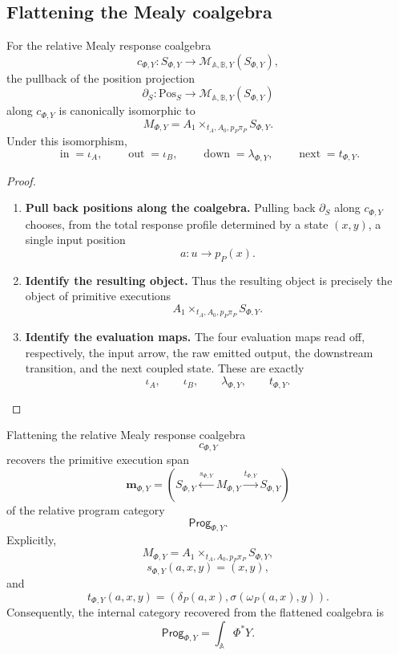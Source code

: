 \subsection{Flattening the Mealy coalgebra}
\label{subsec:poly-relative-flattening-mealy-coalgebra}

\begin{lemma}
\label{lem:poly-relative-mealy-position-pullback}
For the relative Mealy response coalgebra
\[
c_{\Phi,Y}:S_{\Phi,Y}\to
\mathcal M_{\mathbb A,\mathbb B,Y}(S_{\Phi,Y}),
\]
the pullback of the position projection
\[
\partial_S:\mathrm{Pos}_S\to
\mathcal M_{\mathbb A,\mathbb B,Y}(S_{\Phi,Y})
\]
along \(c_{\Phi,Y}\) is canonically isomorphic to
\[
M_{\Phi,Y}
=
A_1\times_{t_A,A_0,p_P\pi_P}S_{\Phi,Y}.
\]
Under this isomorphism,
\[
\operatorname{in}=\iota_A,
\qquad
\operatorname{out}=\iota_B,
\qquad
\operatorname{down}=\lambda_{\Phi,Y},
\qquad
\operatorname{next}=t_{\Phi,Y}.
\]
\end{lemma}

\begin{proof}
\leavevmode
\begin{enumerate}
\item \textbf{Pull back positions along the coalgebra.}
Pulling back \(\partial_S\) along \(c_{\Phi,Y}\) chooses, from the total
response profile determined by a state \((x,y)\), a single input position
\[
a:u\to p_P(x).
\]

\item \textbf{Identify the resulting object.}
Thus the resulting object is precisely the object of primitive executions
\[
A_1\times_{t_A,A_0,p_P\pi_P}S_{\Phi,Y}.
\]

\item \textbf{Identify the evaluation maps.}
The four evaluation maps read off, respectively, the input arrow, the raw
emitted output, the downstream transition, and the next coupled state.  These
are exactly
\[
\iota_A,\qquad
\iota_B,\qquad
\lambda_{\Phi,Y},\qquad
t_{\Phi,Y}.
\]
\end{enumerate}
\end{proof}

\begin{theorem}
\label{thm:poly-relative-program-category-recovered}
Flattening the relative Mealy response coalgebra
\[
c_{\Phi,Y}
\]
recovers the primitive execution span
\[
\mathbf m_{\Phi,Y}
=
\left(
S_{\Phi,Y}
\xleftarrow{s_{\Phi,Y}}
M_{\Phi,Y}
\xrightarrow{t_{\Phi,Y}}
S_{\Phi,Y}
\right)
\]
of the relative program category
\[
\mathsf{Prog}_{\Phi,Y}.
\]
Explicitly,
\[
M_{\Phi,Y}
=
A_1\times_{t_A,A_0,p_P\pi_P}S_{\Phi,Y},
\]
\[
s_{\Phi,Y}(a,x,y)=(x,y),
\]
and
\[
t_{\Phi,Y}(a,x,y)
=
\left(
\delta_P(a,x),
\sigma(\omega_P(a,x),y)
\right).
\]
Consequently, the internal category recovered from the flattened coalgebra is
\[
\mathsf{Prog}_{\Phi,Y}
=
\int_{\mathbb A}\Phi^\ast Y.
\]
\end{theorem}

